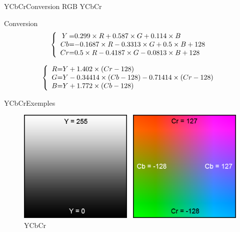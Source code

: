 \begin{frame}{YCbCr}{Conversion RGB YCbCr}

\begin{exampleblock}{Conversion}
\[
 \left \{
 \begin{array}{c @{=} l}
	Y & 0.299 \times R + 0.587 \times G + 0.114 \times B \\
	Cb & -0.1687 \times R - 0.3313 \times G + 0.5 \times B + 128 \\
	Cr & 0.5 \times R - 0.4187 \times G - 0.0813 \times B + 128 \\
 \end{array}
 \right.
\]

\[
 \left \{
 \begin{array}{c @{=} l}
	R & Y + 1.402 \times (Cr - 128) \\
	G & Y - 0.34414 \times (Cb - 128) - 0.71414 \times (Cr - 128) \\
	B & Y + 1.772 \times (Cb - 128) \\
 \end{array}
 \right.
\]
\end{exampleblock}

\end{frame}

\begin{frame}{YCbCr}{Exemples}

\begin{figure}
      \centering
      \includegraphics[scale=0.5]{images/YCbCr.png}
      \caption{YCbCr}
\end{figure}

\end{frame}

